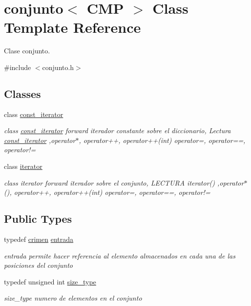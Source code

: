 \hypertarget{classconjunto}{}\section{conjunto$<$ C\+M\+P $>$ Class Template Reference}
\label{classconjunto}


Clase conjunto.  




{\ttfamily \#include $<$conjunto.\+h$>$}

\subsection*{Classes}
\begin{DoxyCompactItemize}
\item 
class \hyperlink{classconjunto_1_1const__iterator}{const\+\_\+iterator}
\begin{DoxyCompactList}\small\item\em class \hyperlink{classconjunto_1_1const__iterator}{const\+\_\+iterator} forward iterador constante sobre el diccionario, Lectura \hyperlink{classconjunto_1_1const__iterator}{const\+\_\+iterator} ,operator$\ast$, operator++, operator++(int) operator=, operator==, operator!= \end{DoxyCompactList}\item 
class \hyperlink{classconjunto_1_1iterator}{iterator}
\begin{DoxyCompactList}\small\item\em class iterator forward iterador sobre el conjunto, L\+E\+C\+T\+U\+R\+A iterator() ,operator$\ast$(), operator++, operator++(int) operator=, operator==, operator!= \end{DoxyCompactList}\end{DoxyCompactItemize}
\subsection*{Public Types}
\begin{DoxyCompactItemize}
\item 
\hypertarget{classconjunto_a7630ace7cb17bcec07daf5804f1a0780}{}typedef \hyperlink{classcrimen}{crimen} \hyperlink{classconjunto_a7630ace7cb17bcec07daf5804f1a0780}{entrada}\label{classconjunto_a7630ace7cb17bcec07daf5804f1a0780}

\begin{DoxyCompactList}\small\item\em entrada permite hacer referencia al elemento almacenados en cada una de las posiciones del conjunto \end{DoxyCompactList}\item 
\hypertarget{classconjunto_a0cc9902da62790ec2a6d59f4559c2df5}{}typedef unsigned int \hyperlink{classconjunto_a0cc9902da62790ec2a6d59f4559c2df5}{size\+\_\+type}\label{classconjunto_a0cc9902da62790ec2a6d59f4559c2df5}

\begin{DoxyCompactList}\small\item\em size\+\_\+type numero de elementos en el conjunto \end{DoxyCompactList}\end{DoxyCompactItemize}
